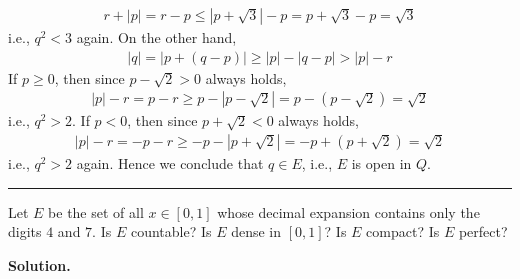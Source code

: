 \documentclass[12pt]{article}
\theoremstyle{definition}
\begin{document}
\begin{align*}
r+\left\vert p\right\vert
=r-p
\le\left\vert p+\sqrt{3}\right\vert-p
=p+\sqrt{3}-p
=\sqrt{3}
\end{align*}
i.e., $q^2<3$ again. On the other hand,
\begin{align*}
\left\vert q\right\vert
=\left\vert p+(q-p)\right\vert
\ge\left\vert p\right\vert-\left\vert q-p\right\vert
>\left\vert p\right\vert-r
\end{align*}
If $p\ge 0$, then since $p-\sqrt{2}>0$ always holds,
\begin{align*}
\left\vert p\right\vert-r
=p-r
\ge p-\left\vert p-\sqrt{2}\right\vert
=p-\left(p-\sqrt{2}\right)
=\sqrt{2}
\end{align*}
i.e., $q^2>2$. If $p<0$, then since $p+\sqrt{2}<0$ always holds,
\begin{align*}
\left\vert p\right\vert-r
=-p-r
\ge-p-\left\vert p+\sqrt{2}\right\vert
=-p+\left(p+\sqrt{2}\right)
=\sqrt{2}
\end{align*}
i.e., $q^2>2$ again. Hence we conclude that $q\in E$, i.e., $E$ is open in $Q$.



\bigskip\noindent\hrule\bigskip

Let $E$ be the set of all $x\in[0,1]$ whose decimal expansion contains only the digits $4$ and $7$. Is $E$ countable? Is $E$ dense in $[0,1]$? Is $E$ compact? Is $E$ perfect?

\smallskip
\noindent\textbf{Solution.}\quad
\end{document}
